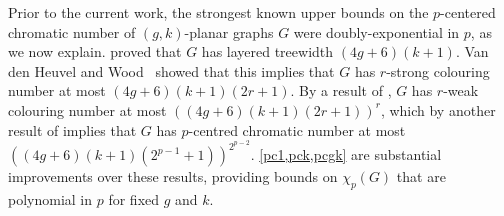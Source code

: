 \documentclass{patmorin}
\begin{document}

Prior to the current work, the strongest known upper bounds on the $p$-centered chromatic number of $(g,k)$-planar graphs $G$ were doubly-exponential in $p$, as we now explain. 
\citet{dujmovic.eppstein.ea:structure} proved that $G$ has layered treewidth $(4g+6)(k+1)$. 
Van den Heuvel and Wood~\citep{vdHW17} showed that this implies that $G$  has $r$-strong colouring number at most $(4g + 6)(k + 1)(2r + 1)$. By a result of \citet{zhu:colouring}, $G$ has $r$-weak colouring number at most $( (4g + 6)(k + 1)(2r + 1) )^r$, which by another result of  \citet{zhu:colouring} implies that $G$ has  $p$-centred chromatic number at most $( (4g+6)(k+1)(2^{p-1} + 1) )^{2^{p-2}}$. 
\cref{pc1,pck,pcgk} are substantial improvements over these results, providing bounds on $\chi_p(G)$ that are polynomial in $p$ for fixed $g$ and $k$. 
\end{document}
